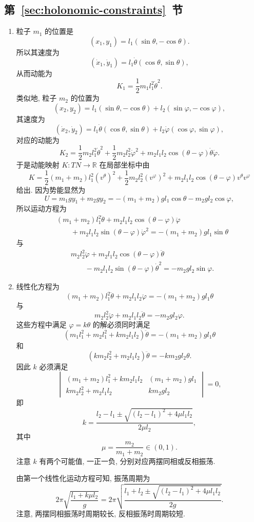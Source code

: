 \subsection{\texorpdfstring{第~\ref{sec:holonomic-constraints}~节}{完整约束}}\label{subsec:solutions-holonomic-constraints}

\begin{description}[font=\normalfont,leftmargin=2em,labelwidth=1.5em]
\begin{enumerate}[label=(\alph*),ref=\alph*,leftmargin=*]
\item 粒子 $m_1$ 的位置是
\[
  (x_1,y_1)=l_1(\sin\theta,-\cos\theta).
\]
所以其速度为
\[
  (\dot{x}_1,\dot y_1)=l_1\dot\theta(\cos\theta,\sin\theta),
\]
从而动能为
\[
  K_1=\frac12m_1l_1^2\dot\theta^2.
\]
类似地, 粒子 $m_2$ 的位置为
\[
  (x_2,y_2)=l_1(\sin\theta,-\cos\theta)+l_2(\sin\varphi,-\cos\varphi),
\]
其速度为
\[
  (\dot{x}_2,\dot y_2)=l_1\dot\theta(\cos\theta,\sin\theta)+l_2\dot\varphi(\cos\varphi,\sin\varphi),
\]
对应的动能为
\[
  K_2=\frac12m_2l_1^2\dot\theta^2+\frac12m_2l_2^2\dot\varphi^2
    +m_2l_1l_2\cos(\theta-\varphi)\dot\theta\dot\varphi.
\]
于是动能映射 $K:TN\to\mathbb{R}$ 在局部坐标中由
\[
  K=\frac12(m_1+m_2)l_1^2(v^\theta)^2+\frac12m_2l_2^2(v^\varphi)^2
    +m_2l_1l_2\cos(\theta-\varphi)v^\theta v^\varphi
\]
给出. 因为势能显然为
\[
  U=m_1gy_1+m_2gy_2=-(m_1+m_2)gl_1\cos\theta-m_2gl_2\cos\varphi,
\]
所以运动方程为
\begin{align*}
  &(m_1+m_2)l_1^2\ddot\theta+m_2l_1l_2\cos(\theta-\varphi)\ddot\varphi\\
  &\qquad+m_2l_1l_2\sin(\theta-\varphi)\dot\varphi^2=-(m_1+m_2)gl_1\sin\theta
\end{align*}
与
\begin{align*}
  &m_2l_2^2\ddot\varphi+m_2l_1l_2\cos(\theta-\varphi)\ddot\theta\\
  &\qquad-m_2l_1l_2\sin(\theta-\varphi)\dot\theta^2=-m_2gl_2\sin\varphi.
\end{align*}
\item 线性化方程为
\[
  (m_1+m_2)l_1^2\ddot\theta+m_2l_1l_2\ddot\varphi=-(m_1+m_2)gl_1\theta
\]
与
\[
  m_2l_2^2\ddot\varphi+m_2l_1l_2\ddot\theta=-m_2gl_2\varphi.
\]
这些方程中满足 $\varphi=k\theta$ 的解必须同时满足
\[
  (m_1l_1^2+m_2l_1^2+km_2l_1l_2)\ddot\theta=-(m_1+m_2)gl_1\theta
\]
和
\[
  (km_2l_2^2+m_2l_1l_2)\ddot\theta=-km_2gl_2\theta.
\]
因此 $k$ 必须满足
\[
  \begin{vmatrix}
    (m_1+m_2)l_1^2+km_2l_1l_2&(m_1+m_2)gl_1\\
    km_2l_2^2+m_2l_1l_2&km_2gl_2
  \end{vmatrix}=0,
\]
即
\[
  k=\frac{l_2-l_1\pm\sqrt{(l_2-l_1)^2+4\mu l_1l_2}}{2\mu l_2},
\]
其中
\[
  \mu=\frac{m_2}{m_1+m_2}\in(0,1).
\]
注意 $k$ 有两个可能值, 一正一负, 分别对应两摆同相或反相振荡.

由第一个线性化运动方程可知, 振荡周期为
\[
  2\pi\sqrt{\frac{l_1+k\mu l_2}{g}}
  =2\pi\sqrt{\frac{l_1+l_2\pm\sqrt{(l_2-l_1)^2+4\mu l_1l_2}}{2g}}.
\]
注意, 两摆同相振荡时周期较长, 反相振荡时周期较短.
\end{enumerate}
\end{description}
